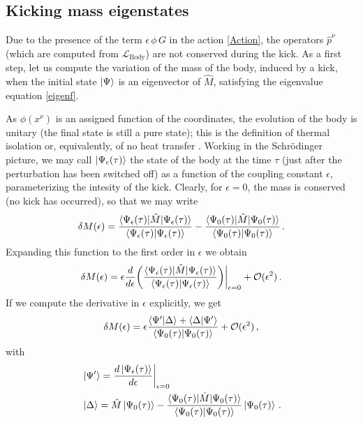 \documentclass[twocolumn,usenatbib]{mnras2}
\begin{document}
\subsection{Kicking mass eigenstates}\label{kickingEigents}

Due to the presence of the term $\epsilon \, \phi \, G$ in the action \eqref{Action}, the operators $\hat{p}^\nu$ (which are computed from $\mathcal{L}_{\text{Body}}$) are not conserved during the kick. As a first step, let us compute the variation of the mass of the body, induced by a kick, when the initial state $\ket{\Psi}$ is an eigenvector of $\hat{M}$, satisfying the eigenvalue equation \eqref{eigenf}.

As $\phi(x^\nu)$ is an assigned function of the coordinates, the evolution of the body is unitary (the final state is still a pure state); this is the definition of thermal isolation \citep{landau5} or, equivalently, of no heat transfer \citep{Jaynes1965}. Working in the  Schr\"{o}dinger picture, we may call $\ket{\Psi_\epsilon(\tau)}$ the state of the body at the time $\tau$ (just after the perturbation has been switched off) as a function of the coupling constant $\epsilon$, parameterizing the intesity of the kick. Clearly, for $\epsilon=0$, the mass is conserved (no kick has occurred), so that we may write
\begin{equation}
    \delta M(\epsilon) = \dfrac{\braket{\Psi_\epsilon(\tau)|\hat{M}|\Psi_\epsilon(\tau)}}{\braket{\Psi_\epsilon(\tau)|\Psi_\epsilon(\tau)}} -\dfrac{\braket{\Psi_0(\tau)|\hat{M}|\Psi_0(\tau)}}{\braket{\Psi_0(\tau)|\Psi_0(\tau)}} \, .
\end{equation}
Expanding this function to the first order in $\epsilon$ we obtain
\begin{equation}
    \delta M(\epsilon) = \epsilon \dfrac{d}{d\epsilon} \bigg( \dfrac{\braket{\Psi_\epsilon(\tau)|\hat{M}|\Psi_\epsilon(\tau)}}{\braket{\Psi_\epsilon(\tau)|\Psi_\epsilon(\tau)}} \bigg) \bigg|_{\epsilon=0} + \mathcal{O}(\epsilon^2) \, .
\end{equation}
If we compute the derivative in $\epsilon$ explicitly, we get
\begin{equation}
   \delta M(\epsilon) = \epsilon \dfrac{\braket{\Psi'|\Delta} +\braket{\Delta|\Psi'}}{\braket{\Psi_0(\tau)|\Psi_0(\tau)}} + \mathcal{O}(\epsilon^2) \, ,
\end{equation}
with 
\begin{equation}\label{gringuzZo}
    \begin{split}
        & \ket{\Psi'} = \dfrac{d \ket{\Psi_\epsilon (\tau)}}{d  \epsilon} \bigg|_{\epsilon=0}  \\
        & \ket{\Delta} = \hat{M} \ket{\Psi_0(\tau)} - \dfrac{\braket{\Psi_0(\tau)|\hat{M}|\Psi_0(\tau)}}{\braket{\Psi_0(\tau)|\Psi_0(\tau)}} \ket{\Psi_0(\tau)} \, .  \\
    \end{split}
\end{equation}
\end{document}
